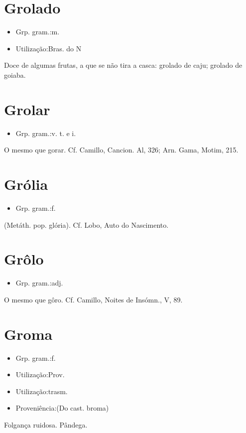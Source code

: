 \section{Grolado}
\begin{itemize}
\item {Grp. gram.:m.}
\end{itemize}
\begin{itemize}
\item {Utilização:Bras. do N}
\end{itemize}
Doce de algumas frutas, a que se não tira a casca: \textunderscore grolado de caju\textunderscore ; \textunderscore grolado de goiaba\textunderscore .
\section{Grolar}
\begin{itemize}
\item {Grp. gram.:v. t.  e  i.}
\end{itemize}
O mesmo que \textunderscore gorar\textunderscore . Cf. Camillo, \textunderscore Cancion. Al\textunderscore , 326; Arn. Gama, \textunderscore Motim\textunderscore , 215.
\section{Grólia}
\begin{itemize}
\item {Grp. gram.:f.}
\end{itemize}
(Metáth. pop. \textunderscore glória\textunderscore ). Cf. Lobo, \textunderscore Auto do Nascimento\textunderscore .
\section{Grôlo}
\begin{itemize}
\item {Grp. gram.:adj.}
\end{itemize}
O mesmo que \textunderscore gôro\textunderscore . Cf. Camillo, \textunderscore Noites de Insómn.\textunderscore , V, 89.
\section{Groma}
\begin{itemize}
\item {Grp. gram.:f.}
\end{itemize}
\begin{itemize}
\item {Utilização:Prov.}
\end{itemize}
\begin{itemize}
\item {Utilização:trasm.}
\end{itemize}
\begin{itemize}
\item {Proveniência:(Do cast. \textunderscore broma\textunderscore )}
\end{itemize}
Folgança ruidosa.
Pândega.
